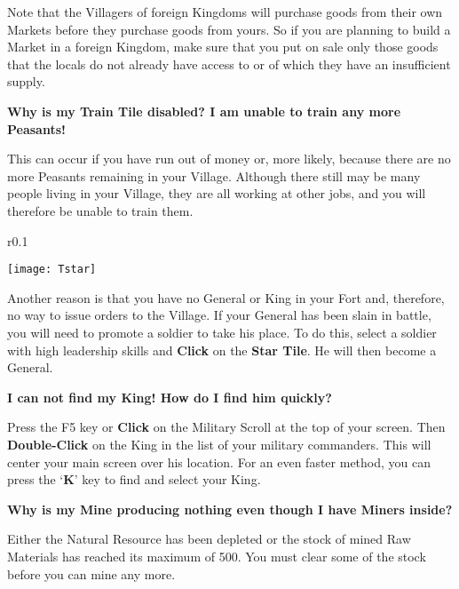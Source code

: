 Note that the Villagers of foreign Kingdoms will purchase goods from their own Markets before they purchase goods from yours. So if you are planning to build a Market in a foreign Kingdom, make sure that you put on sale only those goods that the locals do not already have access to or of which they have an insufficient supply.

{\large \textbf{\textsf{Why is my Train Tile disabled? I am unable to train any more Peasants!}}}

This can occur if you have run out of money or, more likely, because there are no more Peasants remaining in your Village. Although there still may be many people living in your Village, they are all working at other jobs, and you will therefore be unable to train them.

\begin{wrapfigure}{r}{0.1\textwidth}
    \vspace{-20pt}
    \begin{center}
        \texttt{[image: Tstar]}
    \end{center}
    \vspace{-20pt}
\end{wrapfigure}


Another reason is that you have no General or King in your Fort and, therefore, no way to issue orders to the Village. If your General has been slain in battle, you will need to promote a soldier to take his place. To do this, select a soldier with high leadership skills and \textbf{Click} on the \textbf{Star Tile}. He will then become a General.

{\large \textbf{\textsf{I can not find my King! How do I find him quickly?}}}


Press the F5 key or \textbf{Click} on the Military Scroll at the top of your screen. Then \textbf{Double-Click} on the King in the list of your military commanders. This will center your main screen over his location. For an even faster method, you can press the ‘\textbf{K}’ key to find and select your King.

{\large \textbf{\textsf{Why is my Mine producing nothing even though I have Miners inside?}}}

Either the Natural Resource has been depleted or the stock of mined Raw Materials has reached its maximum of 500. You must clear some of the stock before you can mine any more.

